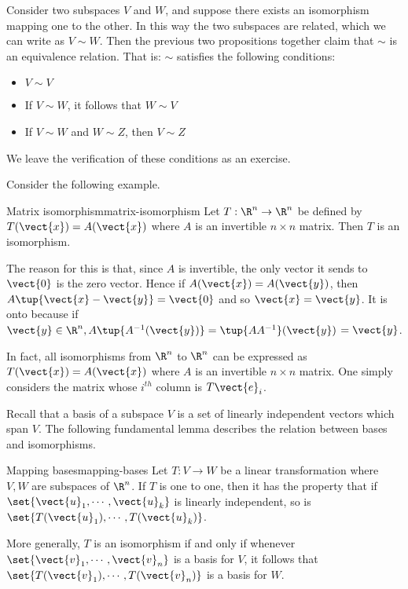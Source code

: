 Consider two subspaces $V$ and $W$, and suppose there exists an isomorphism mapping one to the other. In this way the two subspaces are related, which we can write as $V \sim W$. Then the previous two propositions together claim that $\sim $ is an equivalence relation. That is: $\sim $
satisfies the following conditions:

\begin{itemize}
\item $V\sim V$

\item If $V\sim W$, it follows that $W\sim V$

\item If $V\sim W$ and $W\sim Z$, then $V\sim Z$
\end{itemize}

We leave the verification of these conditions as an exercise.

Consider the following example. 

\begin{example}{Matrix isomorphism}{matrix-isomorphism}
Let $T:\R^{n}\rightarrow \R^{n}$ be defined by $T(\vect{x}) = A(\vect{x})$ where $A$ is an invertible $n\times n$ matrix. Then $T$ is
an isomorphism.
\end{example}

\begin{solution}
The reason for this is that, since $A$ is invertible, the only vector it
sends to $\vect{0}$ is the zero vector. Hence if $A(\vect{x})=A(\vect{y})$, then $A\tup{\vect{x}-\vect{y}} =\vect{0}$ and so $\vect{x}=\vect{y}$. It is onto
because if $\vect{y}\in \R^{n},A\tup{A^{-1} (\vect{y})} =\tup{
AA^{-1}} (\vect{y})$ $=\vect{y}$. 
\end{solution}

In fact, all isomorphisms from $\R^{n}$ to $\R^{n}$ can be expressed as $T(\vect{x}) = A(\vect{x})$ where $A$ is an invertible $n \times n$ matrix. One
simply considers the matrix whose $i^{th}$ column is $T\vect{e}_{i}$.

Recall that a basis of a subspace $V$ is a set of linearly independent vectors which span $V$. The following fundamental lemma describes the relation between bases and
isomorphisms.

\begin{lemma}{Mapping bases}{mapping-bases}
Let $T:V\rightarrow W$ be a linear transformation where $V,W$ are
subspaces of $\R^n$. If $T$ is one to one, then it has the property that if $\set{\vect{u}_{1},\cdots ,\vect{u}_{k}} $ is linearly independent, so is $\set{T(\vect{u}_{1}),\cdots ,T(\vect{u}_{k})} $.

More generally, $T$ is an isomorphism if and only if whenever $\set{
\vect{v}_{1},\cdots ,\vect{v}_{n}} $ is a basis for $V$, it follows that $\set{T
(\vect{v}_{1}),\cdots ,T(\vect{v}_{n})} $ is a basis for $W$. 
\end{lemma}

